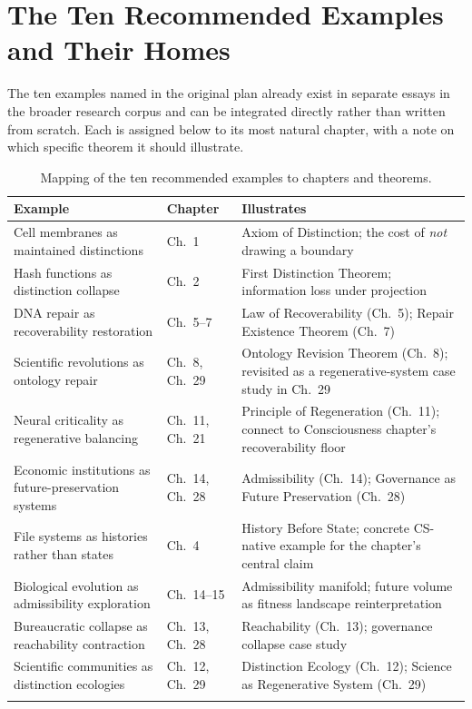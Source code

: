 \documentclass[11pt]{report}
\begin{document}
\section{The Ten Recommended Examples and Their Homes}

The ten examples named in the original plan already exist in
separate essays in the broader research corpus and can be
integrated directly rather than written from scratch. Each is
assigned below to its most natural chapter, with a note on
which specific theorem it should illustrate.

\begin{longtable}{@{}p{4.3cm}p{2.2cm}p{8.4cm}@{}}
\toprule
Example & Chapter & Illustrates \\
\midrule
\endhead
Cell membranes as maintained distinctions & Ch.~1 & Axiom of Distinction; the cost of \emph{not} drawing a boundary \\
Hash functions as distinction collapse & Ch.~2 & First Distinction Theorem; information loss under projection \\
DNA repair as recoverability restoration & Ch.~5--7 & Law of Recoverability (Ch.~5); Repair Existence Theorem (Ch.~7) \\
Scientific revolutions as ontology repair & Ch.~8, Ch.~29 & Ontology Revision Theorem (Ch.~8); revisited as a regenerative-system case study in Ch.~29 \\
Neural criticality as regenerative balancing & Ch.~11, Ch.~21 & Principle of Regeneration (Ch.~11); connect to Consciousness chapter's recoverability floor \\
Economic institutions as future-preservation systems & Ch.~14, Ch.~28 & Admissibility (Ch.~14); Governance as Future Preservation (Ch.~28) \\
File systems as histories rather than states & Ch.~4 & History Before State; concrete CS-native example for the chapter's central claim \\
Biological evolution as admissibility exploration & Ch.~14--15 & Admissibility manifold; future volume as fitness landscape reinterpretation \\
Bureaucratic collapse as reachability contraction & Ch.~13, Ch.~28 & Reachability (Ch.~13); governance collapse case study \\
Scientific communities as distinction ecologies & Ch.~12, Ch.~29 & Distinction Ecology (Ch.~12); Science as Regenerative System (Ch.~29) \\
\bottomrule
\caption{Mapping of the ten recommended examples to chapters
  and theorems.}
\label{tab:priority-b-examples}
\end{longtable}
\end{document}
